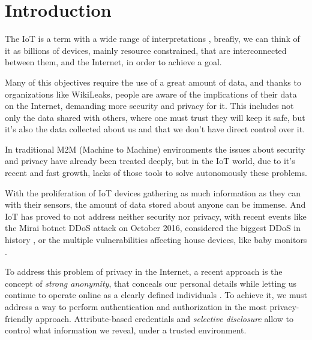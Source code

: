 \documentclass[journal]{IEEEtran}
\begin{document}
\section{Introduction}

The IoT is a term with a wide range of interpretations \cite{Atzori20102787}, breafly, we can think of it as billions of devices, mainly resource constrained, that are interconnected between them, and the Internet, in order to achieve a goal.

Many of this objectives require the use of a great amount of data, and thanks to organizations like WikiLeaks, people are aware of the implications of their data on the Internet, demanding more security and privacy for it. This includes not only the data shared with others, where one must trust they will keep it safe, but it's also the data collected about us and that we don't have direct control over it.

In traditional M2M (Machine to Machine) environments the issues about security and privacy have already been treated deeply, but in the IoT world, due to it's recent and fast growth, lacks of those tools to solve autonomously these problems.

With the proliferation of IoT devices gathering as much information as they can with their sensors, the amount of data stored about anyone can be immense. And IoT has proved to not address neither security nor privacy, with recent events like the Mirai botnet DDoS attack on October 2016, considered the biggest DDoS in history \cite{jeyanthi:2017}, or the multiple vulnerabilities affecting house devices, like baby monitors \cite{rapid7babycam}.

To address this problem of privacy in the Internet, a recent approach is the concept of \textit{strong anonymity}, that conceals our personal details while letting us continue to operate online as a clearly defined individuals \cite{stronganonymity}. To achieve it, we must address a way to perform authentication and authorization in the most privacy-friendly approach. Attribute-based credentials and \textit{selective disclosure} allow to control what information we reveal, under a trusted environment.
\end{document}
